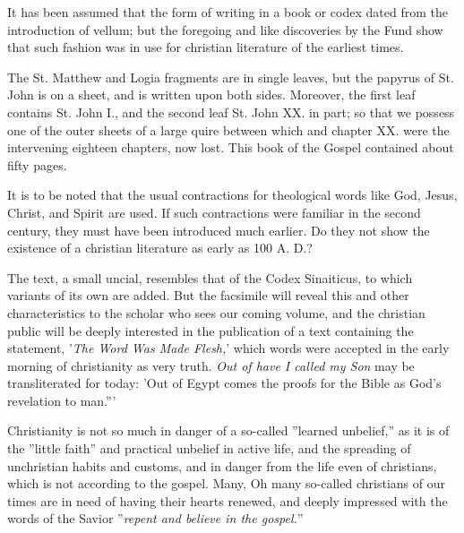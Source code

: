 It has been assumed that the form of writing in a book or codex dated from the introduction of vellum; but the foregoing and like discoveries by the Fund show that such fashion was in use for christian literature of the earliest times.

The St. Matthew and Logia fragments are in single leaves, but the papyrus of St. John is on a sheet, and is written upon both sides. Moreover, the first leaf contains St. John I., and the second leaf St. John XX. in part; so that we possess one of the outer sheets of a large quire between which and chapter XX. were the intervening eighteen chapters, now lost. This book of the Gospel contained about fifty pages.

It is to be noted that the usual contractions for theological words like God, Jesus, Christ, and Spirit are used. If such contractions were familiar in the second century, they must have been introduced much earlier. Do they not show the existence of a christian literature as early as 100 A. D.?

The text, a small uncial, resembles that of the Codex Sinaiticus, to which variants of its own are added. But the facsimile will reveal this and other characteristics to the scholar who sees our coming volume, and the christian public will be deeply interested in the publication of a text containing the statement, '\textit{The Word Was Made Flesh,}' which words were accepted in the early morning of christianity as very truth. \textit{Out of have I called my Son} may be transliterated for today: 'Out of Egypt comes the proofs for the Bible as God's revelation to man.'''

Christianity is not so much in danger of a so-called ''learned unbelief,'' as it is of the ''little faith'' and practical unbelief in active life, and the spreading of unchristian habits and customs, and in danger from the life even of christians, which is not according to the gospel. Many, Oh many so-called christians of our times are in need of having their hearts renewed, and deeply impressed with the words of the Savior ''\textit{repent and believe in the gospel.}''
